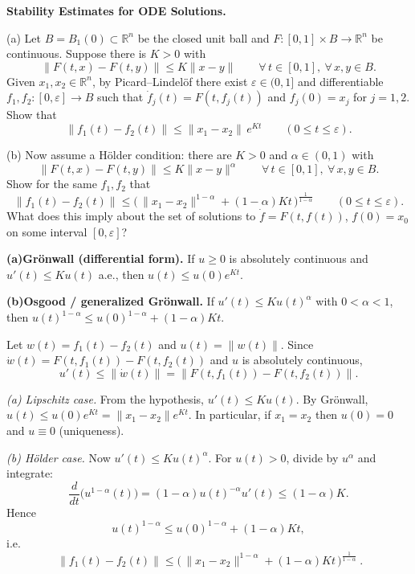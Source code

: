 \begin{problem}[CP-II-0041]
\label{prob:cp-ii-0041}
\textbf{Stability Estimates for ODE Solutions.}

\hspace*{1.5em}(a) Let $B=B_1(0)\subset\mathbb{R}^n$ be the closed unit ball and
$F:[0,1]\times B\to\mathbb{R}^n$ be continuous. Suppose there is $K>0$ with
\[
\|F(t,x)-F(t,y)\|\le K\|x-y\|\qquad \forall\,t\in[0,1],\ \forall\,x,y\in B.
\]
Given $x_1,x_2\in\mathbb{R}^n$, by Picard--Lindel\"of there exist
$\varepsilon\in(0,1]$ and differentiable $f_1,f_2:[0,\varepsilon]\to B$ such that
$\dot f_j(t)=F(t,f_j(t))$ and $f_j(0)=x_j$ for $j=1,2$. Show that
\[
\|f_1(t)-f_2(t)\|\le \|x_1-x_2\|\,e^{Kt}\qquad (0\le t\le\varepsilon).
\]

(b) Now assume a Hölder condition: there are $K>0$ and $\alpha\in(0,1)$ with
\[
\|F(t,x)-F(t,y)\|\le K\|x-y\|^\alpha\qquad \forall\,t\in[0,1],\ \forall\,x,y\in B.
\]
Show for the same $f_1,f_2$ that
\[
\|f_1(t)-f_2(t)\|
\le \Big(\,\|x_1-x_2\|^{1-\alpha}+(1-\alpha)Kt\,\Big)^{\frac{1}{1-\alpha}}
\qquad (0\le t\le\varepsilon).
\]
What does this imply about the set of solutions to
$\dot f=F(t,f(t))$, $f(0)=x_0$ on some interval $[0,\varepsilon]$?

\bigskip
\bigskip

 \setlength{\itemsep}{6pt}
	\par\smallskip\noindent\textbf{(a)}\quad \textbf{Grönwall (differential form).} If $u\ge0$ is absolutely continuous and
	$u'(t)\le Ku(t)$ a.e., then $u(t)\le u(0)e^{Kt}$.
	\par\smallskip\noindent\textbf{(b)}\quad \textbf{Osgood / generalized Grönwall.} If $u'(t)\le Ku(t)^\alpha$ with
	$0<\alpha<1$, then
	$u(t)^{1-\alpha}\le u(0)^{1-\alpha}+(1-\alpha)Kt$.

\bigskip
\end{problem}

\begin{solution}
Let $w(t)=f_1(t)-f_2(t)$ and $u(t)=\|w(t)\|$.
Since $\dot w(t)=F(t,f_1(t))-F(t,f_2(t))$ and $u$ is absolutely continuous,
\[
u'(t)\le \|\dot w(t)\|=\|F(t,f_1(t))-F(t,f_2(t))\|.
\]

\emph{(a) Lipschitz case.}
From the hypothesis, $u'(t)\le Ku(t)$.
By Grönwall, $u(t)\le u(0)e^{Kt}=\|x_1-x_2\|e^{Kt}$.
In particular, if $x_1=x_2$ then $u(0)=0$ and $u\equiv0$ (uniqueness).

\emph{(b) Hölder case.}
Now $u'(t)\le K u(t)^\alpha$.
For $u(t)>0$, divide by $u^\alpha$ and integrate:
\[
\frac{d}{dt}\big(u^{1-\alpha}(t)\big)=(1-\alpha)u(t)^{-\alpha}u'(t)
\le (1-\alpha)K.
\]
Hence
\[
u(t)^{1-\alpha}\le u(0)^{1-\alpha}+(1-\alpha)Kt,
\]
i.e.
\[
\boxed{\ \|f_1(t)-f_2(t)\|
	\le \Big(\,\|x_1-x_2\|^{1-\alpha}+(1-\alpha)Kt\,\Big)^{\frac{1}{1-\alpha}} \ }.
\]
\end{solution}

